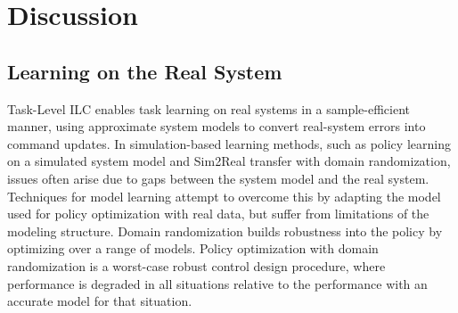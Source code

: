 \documentclass[conference]{IEEEtran}
\begin{document}




\section{Discussion}
\subsection{Learning on the Real System}
Task-Level ILC enables task learning on real systems in a sample-efficient manner, using approximate system models to convert real-system errors into command updates. In simulation-based learning methods, such as policy learning on a simulated system model and Sim2Real transfer with domain randomization, issues often arise due to gaps between the system model and the real system. Techniques for model learning attempt to overcome this by adapting the model used for policy optimization with real data, but suffer from limitations of the modeling structure. Domain randomization builds robustness into the policy by optimizing over a range of models. Policy optimization with domain randomization is a worst-case robust control design procedure, where performance is degraded in all situations relative to the performance with an accurate model for that situation.
\end{document}
